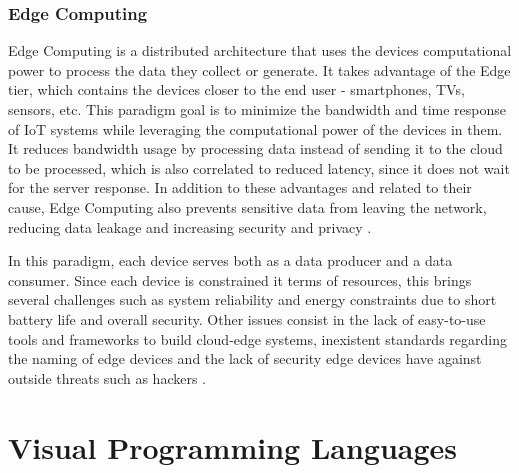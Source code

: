 \subsubsection{Edge Computing}\label{sec:edge_computing}

Edge Computing is a distributed architecture that uses the devices computational power to process the data they collect or generate. It takes advantage of the Edge tier, which contains the devices closer to the end user - smartphones, TVs, sensors, etc. This paradigm goal is to minimize the bandwidth and time response of IoT systems while leveraging the computational power of the devices in them. It reduces bandwidth usage by processing data instead of sending it to the cloud to be processed, which is also correlated to reduced latency, since it does not wait for the server response. In addition to these advantages and related to their cause, Edge Computing also prevents sensitive data from leaving the network, reducing data leakage and increasing security and privacy \cite{edge_computing, edge_computing_2019}.
\par In this paradigm, each device serves both as a data producer and a data consumer. Since each device is constrained it terms of resources, this brings several challenges such as system reliability and energy constraints due to short battery life and overall security. Other issues consist in the lack of easy-to-use tools and frameworks to build cloud-edge systems, inexistent standards regarding the naming of edge devices and the lack of security edge devices have against outside threats such as hackers \cite{promise_of_edge_computing}.

\section{Visual Programming Languages}\label{sec:background_vpl}


